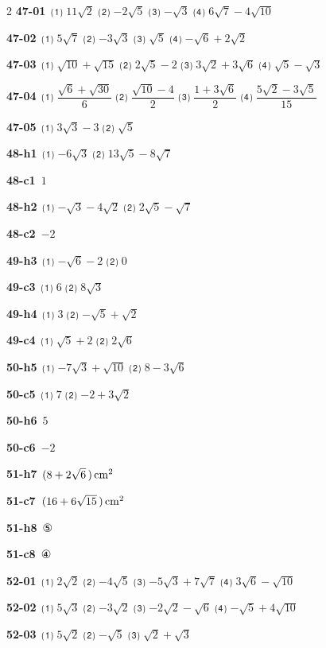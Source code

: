 \documentclass[10pt,a4paper]{article}
\begin{document}
\begin{multicols}{2}
\noindent\textbf{47-01}\ ⑴ $11\sqrt{2}$ ⑵ $-2\sqrt{5}$ ⑶ $-\sqrt{3}$ ⑷ $6\sqrt{7}-4\sqrt{10}$\par
\noindent\textbf{47-02}\ ⑴ $5\sqrt{7}$ ⑵ $-3\sqrt{3}$ ⑶ $\sqrt{5}$ ⑷ $-\sqrt{6}+2\sqrt{2}$\par
\noindent\textbf{47-03}\ ⑴ $\sqrt{10}+\sqrt{15}$ ⑵ $2\sqrt{5}-2$ ⑶ $3\sqrt{2}+3\sqrt{6}$ ⑷ $\sqrt{5}-\sqrt{3}$\par
\noindent\textbf{47-04}\ ⑴ $\dfrac{\sqrt{6}+\sqrt{30}}{6}$ ⑵ $\dfrac{\sqrt{10}-4}{2}$ ⑶ $\dfrac{1+3\sqrt{6}}{2}$ ⑷ $\dfrac{5\sqrt{2}-3\sqrt{5}}{15}$\par
\noindent\textbf{47-05}\ ⑴ $3\sqrt{3}-3$ ⑵ $\sqrt{5}$\par
\noindent\textbf{48-h1}\ ⑴ $-6\sqrt{3}$ ⑵ $13\sqrt{5}-8\sqrt{7}$\par
\noindent\textbf{48-c1}\ $1$\par
\noindent\textbf{48-h2}\ ⑴ $-\sqrt{3}-4\sqrt{2}$ ⑵ $2\sqrt{5}-\sqrt{7}$\par
\noindent\textbf{48-c2}\ $-2$\par
\noindent\textbf{49-h3}\ ⑴ $-\sqrt{6}-2$ ⑵ $0$\par
\noindent\textbf{49-c3}\ ⑴ $6$ ⑵ $8\sqrt{3}$\par
\noindent\textbf{49-h4}\ ⑴ $3$ ⑵ $-\sqrt{5}+\sqrt{2}$\par
\noindent\textbf{49-c4}\ ⑴ $\sqrt{5}+2$ ⑵ $2\sqrt{6}$\par
\noindent\textbf{50-h5}\ ⑴ $-7\sqrt{3}+\sqrt{10}$ ⑵ $8-3\sqrt{6}$\par
\noindent\textbf{50-c5}\ ⑴ $7$ ⑵ $-2+3\sqrt{2}$\par
\noindent\textbf{50-h6}\ $5$\par
\noindent\textbf{50-c6}\ $-2$\par
\noindent\textbf{51-h7}\ $(8+2\sqrt{6}\mkern3mu )\mkern3mu \mathrm{cm}^2$\par
\noindent\textbf{51-c7}\ $(16+6\sqrt{15}\mkern3mu )\mkern3mu \mathrm{cm}^2$\par
\noindent\textbf{51-h8}\ ⑤\par
\noindent\textbf{51-c8}\ ④\par
\noindent\textbf{52-01}\ ⑴ $2\sqrt{2}$ ⑵ $-4\sqrt{5}$ ⑶ $-5\sqrt{3}+7\sqrt{7}$ ⑷ $3\sqrt{6}-\sqrt{10}$\par
\noindent\textbf{52-02}\ ⑴ $5\sqrt{3}$ ⑵ $-3\sqrt{2}$ ⑶ $-2\sqrt{2}-\sqrt{6}$ ⑷ $-\sqrt{5}+4\sqrt{10}$\par
\noindent\textbf{52-03}\ ⑴ $5\sqrt{2}$ ⑵ $-\sqrt{5}$ ⑶ $\sqrt{2}+\sqrt{3}$\par

\end{multicols}
\end{document}
